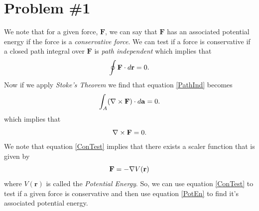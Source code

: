\documentclass[11pt]{article}
\numberwithin{equation}{section}
\begin{document}


\section{Problem \#1}
We note that for a given force, $\mathbf{F}$, we can say that $\mathbf{F}$ has an associated
potential energy if the force is a \emph{conservative force}. We can test if a force is 
conservative if a closed path integral over $\mathbf{F}$ is \emph{path independent} which 
implies that
\begin{equation}
\oint\mathbf{F}\cdot d\mathbf{r} = 0\textnormal{.}
\label{PathInd}
\end{equation}
Now if we apply \emph{Stoke's Theorem} we find that equation \ref{PathInd} becomes
$$\int_{A}(\bold\nabla\times\mathbf{F})\cdot d\mathbf{a} = 0\textnormal{.}$$
which implies that
\begin{equation}
\bold\nabla\times\mathbf{F} = 0.
\label{ConTest}
\end{equation}
We note that equation \ref{ConTest} implies that there exists a scaler function that is 
given by 
\begin{equation}
\mathbf{F} = -\bold\nabla V(\mathbf{r})
\label{PotEn}
\end{equation}
where $V(\mathbf{r})$ is called the \emph{Potential Energy}.
So, we can use equation \ref{ConTest} to test if a given force is conservative and then use
equation \ref{PotEn} to find it's associated potential energy.
\end{document}
